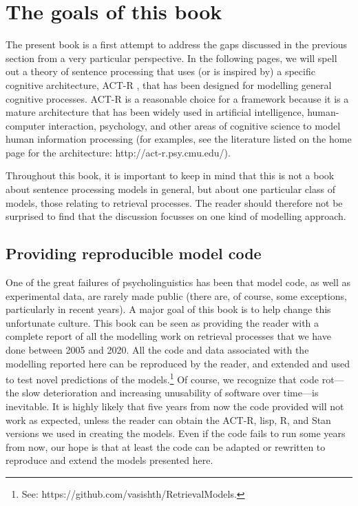 \documentclass{cambridge7A}\usepackage[]{graphicx}\usepackage[]{color}
\begin{document}
\section{The goals of this book}

The present book is a first attempt to address the gaps discussed in the previous section from a very particular perspective.
In the following pages, we will spell out a theory of
sentence processing \citep{LewisVasishth2005} that uses (or is inspired by) a specific cognitive
architecture,  ACT-R \citep{AndersonEtAl2004}, that has been designed for
modelling general cognitive processes. ACT-R is a reasonable choice
for a framework because it is a mature architecture that has been
widely used in artificial intelligence, human-computer interaction,
psychology, and other areas of cognitive science to model human
information processing (for examples, see the literature listed on the home page for the architecture: http://act-r.psy.cmu.edu/). 

Throughout this book, it is important to keep in mind that this is not a book about sentence processing models in general, but about one particular class of models, those relating to retrieval processes. The reader should therefore not be surprised to find that the discussion focusses on one kind of modelling approach. 

\subsection{Providing reproducible model code}

One of the great failures of psycholinguistics has been that model code, as well as experimental data, are rarely made public (there are, of course, some exceptions, particularly in recent years). A major goal of this book is to help change this unfortunate culture. This book can be seen as providing the reader with a complete report of all the modelling work on retrieval processes that we have done between 2005 and 2020. All the code and data associated with the modelling reported here can be reproduced by the reader, and extended and used to test novel predictions of the models.\footnote{See: https://github.com/vasishth/RetrievalModels.} Of course, we recognize that code rot---the slow deterioration and increasing unusability of software over time---is inevitable. It is highly likely that five years from now the code provided will not work as expected, unless the reader can obtain the ACT-R, lisp, R, and Stan versions we used in creating the models. Even if  the code fails to run some years from now, our hope is that at least the code can be adapted or rewritten to reproduce and extend the models presented here.
\end{document}
